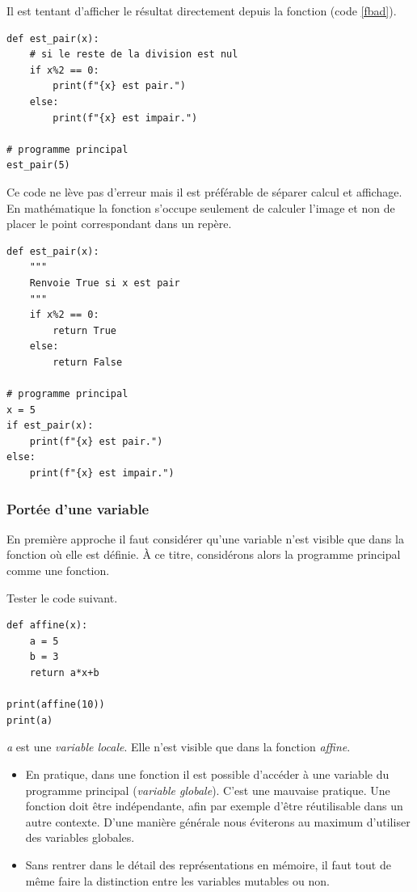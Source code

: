 \documentclass[a4paper,11pt]{article}
\begin{document}
\begin{Form}
\begin{aretenir}
Il est tentant d'afficher le résultat directement depuis la fonction (code \ref{fbad}).
\begin{center}
\begin{lstlisting}
def est_pair(x):
	# si le reste de la division est nul
	if x%2 == 0:
		print(f"{x} est pair.")
	else:
		print(f"{x} est impair.")

# programme principal
est_pair(5)
\end{lstlisting}
\label{fbad}
\end{center}

Ce code ne lève pas d'erreur mais il est préférable de séparer calcul et affichage. En mathématique la fonction s'occupe seulement de calculer l'image et non de placer le point correspondant dans un repère.
\begin{center}
\begin{lstlisting}
def est_pair(x):
	"""
	Renvoie True si x est pair
	"""
	if x%2 == 0:
		return True
	else:
		return False

# programme principal
x = 5
if est_pair(x):
	print(f"{x} est pair.")
else:
	print(f"{x} est impair.")
\end{lstlisting}
\label{moncode}
\end{center}
\end{aretenir}
\subsubsection{Portée d'une variable}
En première approche il faut considérer qu'une variable n'est visible que dans la fonction où elle est définie. À ce titre, considérons alors la programme principal comme une fonction.
\begin{activite}
Tester le code suivant.
\begin{center}
\begin{lstlisting}
def affine(x):
	a = 5
	b = 3
	return a*x+b

print(affine(10))
print(a)
\end{lstlisting}
\label{moncode}
\end{center}

\emph{a} est une \emph{variable locale}. Elle n'est visible que dans la fonction \emph{affine}.
\end{activite}
\begin{aretenir}
\begin{itemize}
\item En pratique, dans une fonction il est possible d'accéder à une variable du programme principal (\emph{variable globale}). C'est une mauvaise pratique. Une fonction doit être indépendante, afin par exemple d'être réutilisable dans un autre contexte. D'une manière générale nous éviterons au maximum d'utiliser des variables globales.
\item Sans rentrer dans le détail des représentations en mémoire, il faut tout de même faire la distinction entre les variables mutables ou non.


\end{itemize}
\end{aretenir}
\end{Form}
\end{document}
